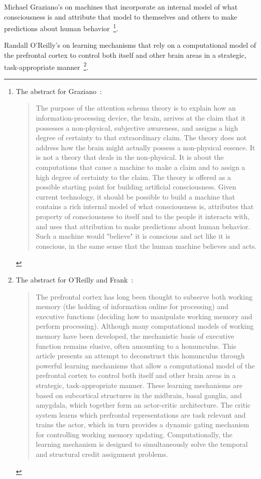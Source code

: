 Michael Graziano's {} on machines that incorporate an internal model of what consciousness is and attribute that model to themselves and others to make predictions about human behavior~\cite{GrazianoFiRAI-17}\footnote{%
%
  The abstract for Graziano~\cite{GrazianoFiRAI-17}:
%
  \begin{quotation}
%
   The purpose of the attention schema theory is to explain how an information-processing device, the brain, arrives at the claim that it possesses a non-physical, subjective awareness, and assigns a high degree of certainty to that extraordinary claim. The theory does not address how the brain might actually possess a non-physical essence. It is not a theory that deals in the non-physical. It is about the computations that cause a machine to make a claim and to assign a high degree of certainty to the claim. The theory is offered as a possible starting point for building artificial consciousness. Given current technology, it should be possible to build a machine that contains a rich internal model of what consciousness is, attributes that property of consciousness to itself and to the people it interacts with, and uses that attribution to make predictions about human behavior. Such a machine would "believe" it is conscious and act like it is conscious, in the same sense that the human machine believes and acts.
%
  \end{quotation}}.

Randall O'Reilly's {} on learning mechanisms that rely on a computational model of the prefrontal cortex to control both itself and other brain areas in a strategic, task-appropriate manner~\cite{OReillyandFrankNC-06}\footnote{%
%
  The abstract for O'Reilly and Frank~\cite{OReillyandFrankNC-06}:
%
  \begin{quotation}
%
   The prefrontal cortex has long been thought to subserve both working memory (the holding of information online for processing) and executive functions (deciding how to manipulate working memory and perform processing). Although many computational models of working memory have been developed, the mechanistic basis of executive function remains elusive, often amounting to a homunculus. This article presents an attempt to deconstruct this homunculus through powerful learning mechanisms that allow a computational model of the prefrontal cortex to control both itself and other brain areas in a strategic, task-appropriate manner. These learning mechanisms are based on subcortical structures in the midbrain, basal ganglia, and amygdala, which together form an actor-critic architecture. The critic system learns which prefrontal representations are task relevant and trains the actor, which in turn provides a dynamic gating mechanism for controlling working memory updating. Computationally, the learning mechanism is designed to simultaneously solve the temporal and structural credit assignment problems.
%
  \end{quotation}}.

